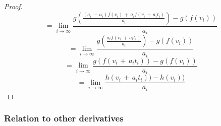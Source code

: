 \documentclass[11pt,letterpaper,fleqn]{memoir}
\begin{document}
\begin{proof}
$$
= \lim_{i \to \infty} \frac{g(\frac{(a_{i}\,-\,a_{i})f(v_{i})\,+\,a_{i}f(v_{i}\,+\,a_{i}t_{i})}{a_{i}}) - g(f(v_{i}))}{a_{i}} 
$$
$$
= \lim_{i \to \infty} \frac{g(\frac{a_{i}f(v_{i}\,+\,a_{i}t_{i})}{a_{i}}) - g(f(v_{i}))}{a_{i}} 
$$
$$
= \lim_{i \to \infty} \frac{g(f(v_{i}\,+\,a_{i}t_{i})) - g(f(v_{i}))}{a_{i}} 
$$
$$
= \lim_{i \to \infty} \frac{h(v_{i}\,+\,a_{i}t_{i})) - h(v_{i}))}{a_{i}} 
$$

\end{proof}

\subsubsection{Relation to other derivatives}
\end{document}
